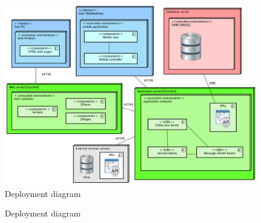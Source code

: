 \begin{figure}
	\centering
	\includegraphics[width=1.3\textwidth]{images/deploymentdiagram}
	\caption{Deployment diagram}
	
	\label{fig:deploymentdiagram}
\end{figure}
\begin{figure} 
\begin{center}

\caption{Deployment diagram} 
\label{fig:deploymentdiagram} 


\end{center}
\end{figure} 
